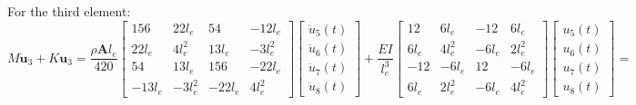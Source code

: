 \documentclass[14pt,a4paper]{article}
\begin{document}
\begin{enumerate}
	For the third element:\\
	$M\ddot{\textbf{u}}_3 + K\textbf{u}_3 = \dfrac{\rho \textbf{A}l_e}{420} \begin{bmatrix} 156 & 22l_e & 54 & -12l_e \\ 22l_e & 4l_e^2 & 13l_e & -3l_e^2 \\ 54 & 13l_e & 156 & -22l_e \\ -13l_e & -3l_e^2 & -22l_e & 4l_e^2 \end{bmatrix} \begin{bmatrix} \ddot{u}_5(t) \\ \ddot{u}_6(t) \\ \ddot{u}_7(t) \\ \ddot{u}_8(t) \end{bmatrix} + \dfrac{EI}{l_e^3} \begin{bmatrix} 12 & 6l_e & -12 & 6l_e \\ 6l_e & 4l_e^2 & -6l_e & 2l_e^2 \\ -12 & -6l_e & 12 & -6l_e \\ 6l_e & 2l_e^2 & -6l_e & 4l_e^2 \end{bmatrix} \begin{bmatrix} u_5(t) \\ u_6(t) \\ u_7(t) \\ u_8(t) \end{bmatrix} =$\\
	

\end{enumerate}
\end{document}
